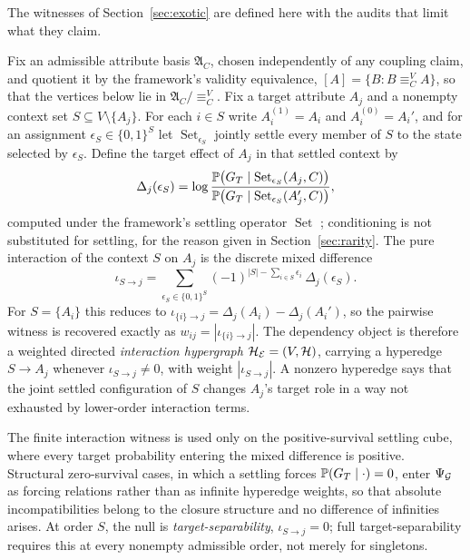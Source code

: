 The witnesses of Section~\ref{sec:exotic} are defined here with the audits
that limit what they claim. \begin{definition}\label{def:exotic}
Fix an admissible attribute basis $\mathfrak A_C$, chosen independently
of any coupling claim, and quotient it by the framework's validity
equivalence, $[A]=\{B:B\equiv^{V}_{C}A\}$, so that the vertices below
lie in $\mathfrak A_C/{\equiv^{V}_{C}}$. Fix a target attribute $A_j$
and a nonempty context set $S\subseteq V\setminus\{A_j\}$. For each
$i\in S$ write $A_i^{(1)}=A_i$ and $A_i^{(0)}=A_i'$, and for an
assignment $\epsilon_S\in\{0,1\}^{S}$ let
$\operatorname{Set}_{\epsilon_S}$ jointly settle every member of $S$
to the state selected by $\epsilon_S$. Define the target effect of
$A_j$ in that settled context by
\[
\Delta_j(\epsilon_S)=
\log\frac{\mathbb{P}\bigl(G_T\mid
\operatorname{Set}_{\epsilon_S}(A_j,C)\bigr)}
{\mathbb{P}\bigl(G_T\mid
\operatorname{Set}_{\epsilon_S}(A_j',C)\bigr)},
\]
computed under the framework's settling operator $\operatorname{Set}$
\cite{Aethus}; conditioning is not substituted for settling, for the
reason given in Section~\ref{sec:rarity}. The pure interaction of the
context $S$ on $A_j$ is the discrete mixed difference
\[
\iota_{S\to j}
=
\sum_{\epsilon_S\in\{0,1\}^{S}}
(-1)^{|S|-\sum_{i\in S}\epsilon_i}\,
\Delta_j(\epsilon_S).
\]
For $S=\{A_i\}$ this reduces to
$\iota_{\{i\}\to j}=\Delta_j(A_i)-\Delta_j(A_i')$, so the pairwise
witness is recovered exactly as $w_{ij}=|\iota_{\{i\}\to j}|$. The
dependency object is therefore a weighted directed \emph{interaction
hypergraph} $\mathcal H_{\mathcal{E}}=(V,\mathcal H)$, carrying a hyperedge
$S\to A_j$ whenever $\iota_{S\to j}\neq0$, with weight $|\iota_{S\to
j}|$. A nonzero hyperedge says that the joint settled configuration of
$S$ changes $A_j$'s target role in a way not exhausted by lower-order
interaction terms.

The finite interaction witness is used only on the positive-survival
settling cube, where every target probability entering the mixed
difference is positive. Structural zero-survival cases, in which a
settling forces $\mathbb{P}(G_T\mid\cdot)=0$, enter $\Psi_{\mathcal{G}}$ as forcing
relations rather than as infinite hyperedge weights, so that absolute
incompatibilities belong to the closure structure and no difference of
infinities arises. At order $S$, the null is \emph{target-separability},
$\iota_{S\to j}=0$; full target-separability requires this at every
nonempty admissible order, not merely for singletons.


\end{definition}
